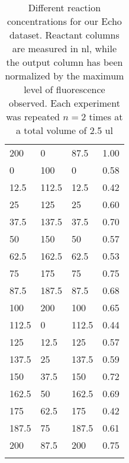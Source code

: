 \begin{longtable}{lll | l}
200      & 0     & 87.5  & 1.00 \\
0        & 100   & 0     & 0.58 \\
12.5     & 112.5 & 12.5  & 0.42 \\
25       & 125   & 25    & 0.60 \\
37.5     & 137.5 & 37.5  & 0.70 \\
50       & 150   & 50    & 0.57 \\
62.5     & 162.5 & 62.5  & 0.53 \\
75       & 175   & 75    & 0.75 \\
87.5     & 187.5 & 87.5  & 0.68 \\
100      & 200   & 100   & 0.65 \\
112.5    & 0     & 112.5 & 0.44 \\
125      & 12.5  & 125   & 0.57 \\
137.5    & 25    & 137.5 & 0.59 \\
150      & 37.5  & 150   & 0.72 \\
162.5    & 50    & 162.5 & 0.69 \\
175      & 62.5  & 175   & 0.42 \\
187.5    & 75    & 187.5 & 0.61 \\
200      & 87.5  & 200   & 0.75 \\
\caption[Different reaction concentrations for our Echo dataset]{Different reaction concentrations for our Echo dataset.
Reactant columns are measured in \gls{nl}, while the output column has been normalized by the maximum level of fluorescence observed.
Each experiment was repeated $n = 2$ times at a total volume of 2.5 \gls{ul}}
\label{tab:echo}
\end{longtable}